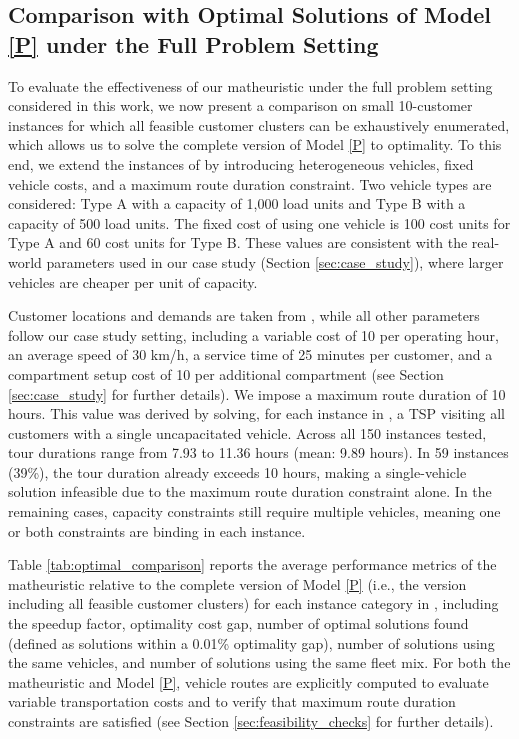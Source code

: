 \documentclass[11pt]{elsarticle}
\theoremstyle{plain}
\begin{document}

\subsection{Comparison with Optimal Solutions of Model \eqref{P} under the Full Problem Setting}

To evaluate the effectiveness of our matheuristic under the full problem setting considered in this work, we now present a comparison on small 10-customer instances for which all feasible customer clusters can be exhaustively enumerated, which allows us to solve the complete version of Model \eqref{P} to optimality. To this end, we extend the instances of \cite{henke2015multi} by introducing heterogeneous vehicles, fixed vehicle costs, and a maximum route duration constraint. Two vehicle types are considered: Type A with a capacity of 1,000 load units \citep[as defined by][]{henke2015multi} and Type B with a capacity of 500 load units. The fixed cost of using one vehicle is 100 cost units for Type A and 60 cost units for Type B. These values are consistent with the real-world parameters used in our case study (Section \ref{sec:case_study}), where larger vehicles are cheaper per unit of capacity.

Customer locations and demands are taken from \cite{henke2015multi}, while all other parameters follow our case study setting, including a variable cost of 10 per operating hour, an average speed of 30 km/h, a service time of 25 minutes per customer, and a compartment setup cost of 10 per additional compartment (see Section \ref{sec:case_study} for further details). We impose a maximum route duration of 10 hours. This value was derived by solving, for each instance in \cite{henke2015multi}, a \ac{TSP} visiting all customers with a single uncapacitated vehicle. Across all 150 instances tested, tour durations range from 7.93 to 11.36 hours (mean: 9.89 hours). In 59 instances (39\%), the tour duration already exceeds 10 hours, making a single-vehicle solution infeasible due to the maximum route duration constraint alone. In the remaining cases, capacity constraints still require multiple vehicles, meaning one or both constraints are binding in each instance.

Table \ref{tab:optimal_comparison} reports the average performance metrics of the matheuristic relative to the complete version of Model \eqref{P} (i.e., the version including all feasible customer clusters) for each instance category in \cite{henke2015multi}, including the speedup factor, optimality cost gap, number of optimal solutions found (defined as solutions within a 0.01\% optimality gap), number of solutions using the same vehicles, and number of solutions using the same fleet mix. For both the matheuristic and Model \eqref{P}, vehicle routes are explicitly computed to evaluate variable transportation costs and to verify that maximum route duration constraints are satisfied (see Section \ref{sec:feasibility_checks} for further details). 
\end{document}
